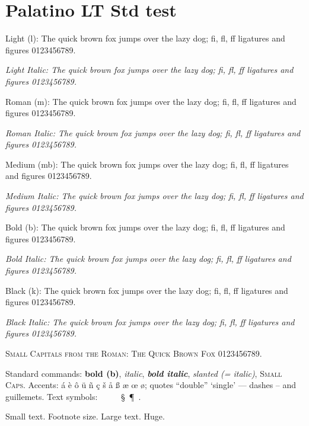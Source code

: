 \documentclass[11pt]{article}
\newcommand{\pangram}{The quick brown fox jumps over the lazy dog; fi, fl,
  ff ligatures and figures 0123456789.}
\begin{document}
\section*{Palatino LT Std test}

{\selectfont Light (l): \pangram\par
 \itshape Light Italic: \pangram\par}
{\selectfont Roman (m): \pangram\par
 \itshape Roman Italic: \pangram\par}
{\selectfont Medium (mb): \pangram\par
 \itshape Medium Italic: \pangram\par}
{\selectfont Bold (b): \pangram\par
 \itshape Bold Italic: \pangram\par}
{\selectfont Black (k): \pangram\par
 \itshape Black Italic: \pangram\par}
\textsc{Small Capitals from the Roman: The Quick Brown Fox 0123456789.}\par

\medskip
Standard commands: \textbf{bold (b)}, \textit{italic}, \textbf{\textit{bold
italic}}, \textsl{slanted (= italic)}, \textsc{Small Caps}.
Accents: \'a \`e \^o \"u \~n \c{c} \v{s} \r{a} {\ss} {\ae} {\oe} {\o};
quotes ``double'' `single' --- dashes -- and \guillemotleft guillemets\guillemotright.
Text symbols: \textbullet\ \textdegree\ \texteuro\ \textcopyright\
\textregistered\ \S\ \P\ \textperthousand.

{\small Small text. \footnotesize Footnote size.} {\Large Large text.}
{\Huge Huge.}
\end{document}
